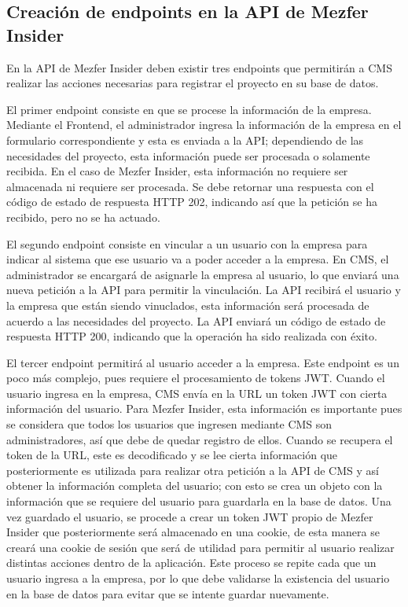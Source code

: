 \subsection{Creación de endpoints en la API de Mezfer Insider}
En la API de Mezfer Insider deben existir tres endpoints que permitirán a CMS realizar las acciones necesarias para registrar el proyecto en su base de datos.

El primer endpoint consiste en que se procese la información de la empresa. Mediante el Frontend, el administrador ingresa la información de la empresa en el formulario correspondiente y esta es enviada a la API; dependiendo de las necesidades del proyecto, esta información puede ser procesada o solamente recibida. En el caso de Mezfer Insider, esta información no requiere ser almacenada ni requiere ser procesada. Se debe retornar una respuesta con el código de estado de respuesta HTTP 202, indicando así que la petición se ha recibido, pero no se ha actuado.

El segundo endpoint consiste en vincular a un usuario con la empresa para indicar al sistema que ese usuario va a poder acceder a la empresa. En CMS, el administrador se encargará de asignarle la empresa al usuario, lo que enviará una nueva petición a la API para permitir la vinculación. La API recibirá el usuario y la empresa que están siendo vinuclados, esta información será procesada de acuerdo a las necesidades del proyecto. La API enviará un código de estado de respuesta HTTP 200, indicando que la operación ha sido realizada con éxito.

El tercer endpoint permitirá al usuario acceder a la empresa. Este endpoint es un poco más complejo, pues requiere el procesamiento de tokens JWT. Cuando el usuario ingresa en la empresa, CMS envía en la URL un token JWT con cierta información del usuario.
Para Mezfer Insider, esta información es importante pues se considera que todos los usuarios que ingresen mediante CMS son administradores, así que debe de quedar registro de ellos. Cuando se recupera el token de la URL, este es decodificado y se lee cierta información que posteriormente es utilizada para realizar otra petición a la API de CMS y así obtener la información completa del usuario; con esto se crea un objeto con la información que se requiere del usuario para guardarla en la base de datos. Una vez guardado el usuario, se procede a crear un token JWT propio de Mezfer Insider que posteriormente será almacenado en una cookie, de esta manera se creará una cookie de sesión que será de utilidad para permitir al usuario realizar distintas acciones dentro de la aplicación. Este proceso se repite cada que un usuario ingresa a la empresa, por lo que debe validarse la existencia del usuario en la base de datos para evitar que se intente guardar nuevamente.
